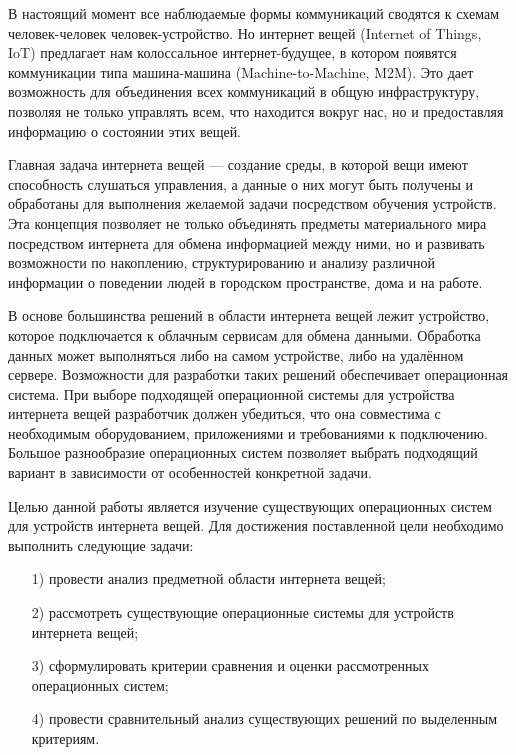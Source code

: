 \Introduction


В настоящий момент все наблюдаемые формы коммуникаций сводятся к схемам человек-человек  человек-устройство. Но интернет вещей (Internet of Things, IoT) предлагает нам колоссальное интернет-будущее, в котором появятся коммуникации типа машина-машина (Machine-to-Machine, M2M). Это дает возможность для объединения всех коммуникаций в общую инфраструктуру, позволяя не только управлять всем, что находится вокруг нас, но и предоставляя информацию о состоянии этих вещей. \cite{Dovgal}


Главная задача интернета вещей \cite{Markeeva} --- создание среды, в которой вещи имеют способность слушаться управления, а данные о них могут быть получены и обработаны для выполнения желаемой задачи посредством обучения устройств. Эта концепция позволяет не только объединять предметы материального мира посредством интернета для обмена информацией между ними, но и развивать возможности по накоплению, структурированию и анализу различной информации о поведении людей в городском пространстве, дома и на работе.



В основе большинства решений в области интернета вещей лежит устройство, которое подключается к облачным сервисам для обмена данными. Обработка данных может выполняться либо на самом устройстве, либо на удалённом сервере. Возможности для разработки таких решений обеспечивает операционная система. При выборе подходящей операционной системы для устройства интернета вещей разработчик должен убедиться, что она совместима с необходимым оборудованием, приложениями и требованиями к подключению. Большое разнообразие операционных систем позволяет выбрать подходящий вариант в зависимости от особенностей конкретной задачи.

Целью данной работы является изучение существующих операционных систем для устройств интернета вещей. Для достижения поставленной цели необходимо выполнить следующие задачи:

\begin{enumerate}
	\item[1)] провести анализ предметной области интернета вещей;
	\item[2)] рассмотреть существующие операционные системы для устройств интернета вещей;
	\item[3)] сформулировать критерии сравнения и оценки рассмотренных операционных систем;
	\item[4)] провести сравнительный анализ существующих решений по выделенным критериям. 
\end{enumerate}

